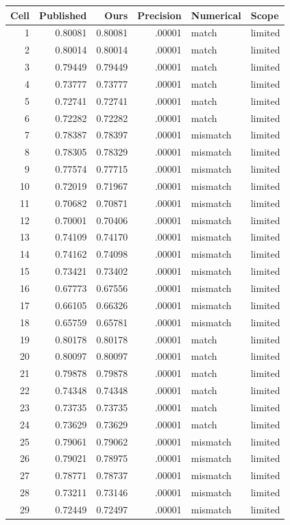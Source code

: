 \documentclass[11pt]{article}
\begin{document}
\small\begin{longtable}{rrrrll}
\toprule Cell&Published&Ours&Precision&Numerical&Scope\\\midrule\endhead
1&0.80081&0.80081&.00001&match&limited\\
2&0.80014&0.80014&.00001&match&limited\\
3&0.79449&0.79449&.00001&match&limited\\
4&0.73777&0.73777&.00001&match&limited\\
5&0.72741&0.72741&.00001&match&limited\\
6&0.72282&0.72282&.00001&match&limited\\
7&0.78387&0.78397&.00001&mismatch&limited\\
8&0.78305&0.78329&.00001&mismatch&limited\\
9&0.77574&0.77715&.00001&mismatch&limited\\
10&0.72019&0.71967&.00001&mismatch&limited\\
11&0.70682&0.70871&.00001&mismatch&limited\\
12&0.70001&0.70406&.00001&mismatch&limited\\
13&0.74109&0.74170&.00001&mismatch&limited\\
14&0.74162&0.74098&.00001&mismatch&limited\\
15&0.73421&0.73402&.00001&mismatch&limited\\
16&0.67773&0.67556&.00001&mismatch&limited\\
17&0.66105&0.66326&.00001&mismatch&limited\\
18&0.65759&0.65781&.00001&mismatch&limited\\
19&0.80178&0.80178&.00001&match&limited\\
20&0.80097&0.80097&.00001&match&limited\\
21&0.79878&0.79878&.00001&match&limited\\
22&0.74348&0.74348&.00001&match&limited\\
23&0.73735&0.73735&.00001&match&limited\\
24&0.73629&0.73629&.00001&match&limited\\
25&0.79061&0.79062&.00001&mismatch&limited\\
26&0.79021&0.78975&.00001&mismatch&limited\\
27&0.78771&0.78737&.00001&mismatch&limited\\
28&0.73211&0.73146&.00001&mismatch&limited\\
29&0.72449&0.72497&.00001&mismatch&limited\\

\end{longtable}
\end{document}
